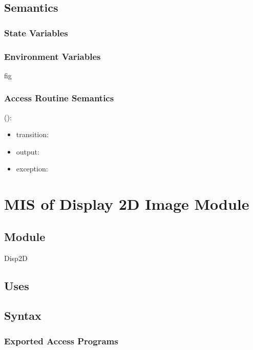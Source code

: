\documentclass[12pt, titlepage]{article}
\begin{document}
\subsection{Semantics}

\subsubsection{State Variables}

\subsubsection{Environment Variables}
fig

\subsubsection{Access Routine Semantics}

\noindent {}():
\begin{itemize}
\item transition:  
\item output:  
\item exception:  
\end{itemize}

\section{MIS of Display 2D Image Module} \label{Mod:Disp2D} 

\subsection{Module}

Disp2D

\subsection{Uses}


\subsection{Syntax}

\subsubsection{Exported Access Programs}
\end{document}
